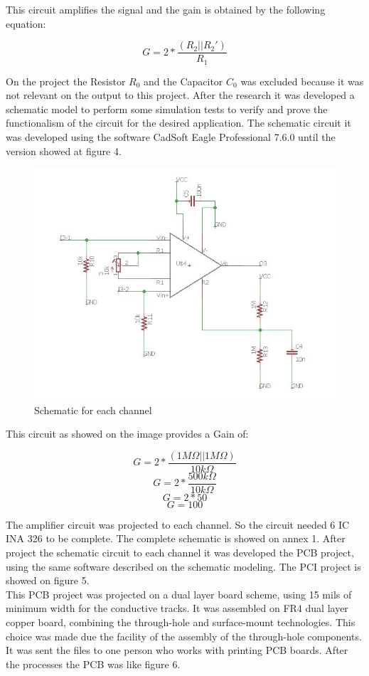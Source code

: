 This circuit amplifies the signal and the gain is obtained by the following equation:

$$G=2*\frac{(R_2||R_2 ')}{R_1}$$

On the project the Resistor $R_0$ and the Capacitor $C_0$ was excluded because
it was not relevant on the output to this project. After the research it was
developed a schematic model to perform some simulation tests to verify and prove
the functionalism of the circuit for the desired application. The schematic circuit
it was developed using the software CadSoft Eagle Professional 7.6.0 until the version
showed at figure 4.

\begin{figure}[!htpb]
\centering
\includegraphics[scale=0.7]{images/INA}
\caption{Schematic for each channel}
\end{figure}

This circuit as showed on the image provides a Gain of:

$$G=2*\frac{(1M\Omega||1M\Omega)}{10k\Omega}$$
$$G=2*\frac{500k\Omega}{10k\Omega}$$
$$G=2*50$$
$$G=100$$

The amplifier circuit was projected to each channel. So the circuit needed 6 IC
INA 326 to be complete. The complete schematic is showed on annex 1. After project
the schematic circuit to each channel it was developed the PCB project, using the
same software described on the schematic modeling. The PCI project is showed on figure 5.\\

This PCB project was projected on a dual layer board scheme, using 15 mils of
minimum width for the conductive tracks. It was assembled on FR4 dual layer copper
board, combining the through-hole and surface-mount technologies. This choice was
made due the facility of the assembly of the through-hole components. It was sent
the files to one person who works with printing PCB boards. After the processes
the PCB was like figure 6.\\

